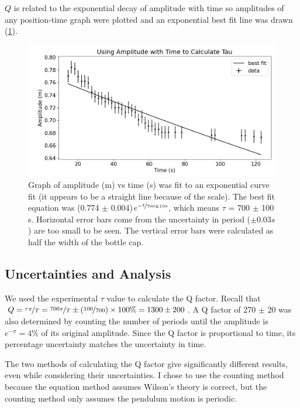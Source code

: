 \documentclass[notitlepage, twocolumn, 12pt]{article}
\begin{document}
    $Q$ is related to the exponential decay of amplitude with time so amplitudes of any position-time graph were plotted and an exponential best fit line was drawn (\cref{fig:amplitudeTgraph}). 

    \begin{figure}[H]
        \includegraphics[width=\linewidth]{suspicious_tau_graph.png}
        \caption{Graph of amplitude (m) vs time (s) was fit to an exponential curve fit (it appears to be a straight line because of the scale). The best fit equation was (0.774 $\pm$ 0.004)$e^{-\nicefrac{t}{700 \pm 100}}$, which means $\tau$ = 700 $\pm$ 100 s.  Horizontal error bars come from the uncertainty in period ($\pm 0.03 s$) are too small to be seen. The vertical error bars were calculated as half the width of the bottle cap.}
        \label{fig:amplitudeTgraph}
    \end{figure}

    \subsection*{Uncertainties and Analysis}
    We used the experimental $\tau$ value to calculate the Q factor. Recall that $Q = \nicefrac{\tau \pi}{T} = \nicefrac{700\pi}{T} \pm (\nicefrac{100}{700})\times 100\% = 1300 \pm 200$. A Q factor of 270 $\pm$ 20 was also determined by counting the number of periods until the amplitude is $e^{-\pi}=4\%$ of its original amplitude. Since the Q factor is proportional to time, its percentage uncertainty matches the uncertainty in time.
    
    The two methods of calculating the Q factor give significantly different results, even while considering their uncertainties. I chose to use the counting method because the equation method assumes Wilson's theory is correct, but the counting method only assumes the pendulum motion is periodic. %
\end{document}
